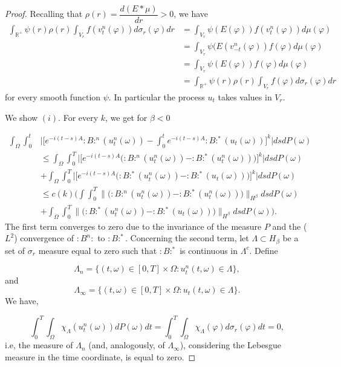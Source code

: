 \documentclass[11pt,leqno]{amsart}
\newcommand{\R}{\mathbb{R}}
\begin{document}
\begin{proof}
\color{black}
Recalling that $\rho(r)= \dfrac{d(E\ast \mu)}{dr} >0$, we have
\begin{align*}
 \int_{\R^+} \psi (r) \rho (r) \int_{V_r} f(v_t^n (\varphi )) d\sigma_r(\varphi) dr&= \int_{V_r} \psi (E(\varphi ))f(v_t^n (\varphi ))d\mu (\varphi )\\
&= \int_{V_r}   \psi (E (v_{-t}^n (\varphi ))f(\varphi )d\mu (\varphi )\\
&= \int_{V_r}   \psi (E (\varphi ))f(\varphi )d\mu (\varphi )\\
&= \int_{\R^+}   \psi (r) \rho (r) \int_{V_r} f(\varphi) d\sigma_r(\varphi) dr
\end{align*}
for every smooth function $\psi$. 
 In particular the process $u_t$ takes values in $V_r$.

We show $(i)$. For every $k$, we get for $\beta <0$ 

\begin{align*}
\int_\Omega  \int_0^t & \Big| \Big[e^{-i(t-s)A} :B:^n (u_t^n (\omega ))- \int_0^t e^{-i(t-s)A} :B:^\ast  (u_t (\omega ))\Big]^k \Big| ds dP (\omega)\\
&\leq  \int_\Omega  \int_0^T \Big| \Big[e^{-i(t-s)A} \Big( :B:^n (u_t^n( \omega) )- :B:^\ast (u_t^n(\omega) )\Big)\Big]^k \Big| ds dP(\omega) \\
&+\int _\Omega\int_0^T \Big| \Big[e^{-i(t-s)A} \Big( :B:^\ast (u_t^n(\omega) )- :B:^\ast (u_t(\omega) )\Big)\Big]^k \Big| ds dP(\omega) \\
&\leq c(k) \Big( \int  \int_0^T \Big\| \Big( :B:^n (u_t^n(\omega) )- :B:^\ast (u_t^n(\omega) )\Big) \Big\|_{H^\beta} ds dP(\omega) \\
&+\int_\Omega \int_0^T  \Big\| \Big( :B:^\ast (u_t^n(\omega) )- :B:^\ast (u_t(\omega) )\Big)  \Big\|_{H^\beta} ds dP(\omega) \Big).
\end{align*}
The first term converges to zero due to the invariance of the measure $P$ and the ($L^2$) convergence of $:B^n :$ to $:B:^\ast$. Concerning the second term,
let $\Lambda\subset H_\beta$ be a set of $\sigma_r$ measure equal to zero such that $:B:^\ast$ is continuous in $\Lambda^c $. Define 

$$\Lambda_n =\{(t,\omega )\in [0,T]\times \Omega : u_t^n (t,\omega ) \in  \Lambda \}, $$
and
$$\Lambda_\infty =\{(t,\omega )\in [0,T]\times \Omega : u_t (t,\omega ) \in \Lambda \}.$$
We have,

$$\int_0^T \int_\Omega \chi_\Lambda (u_t^n (\omega ))  dP(\omega ) dt =\int_0^T \int_\Omega \chi_\Lambda (\varphi ) d\sigma_r (\varphi )dt =0, $$
i.e, the measure of $\Lambda_n$ (and, analogously, of $\Lambda_\infty$), considering the Lebesgue measure in the time coordinate, is equal to zero.


\end{proof}
\end{document}
